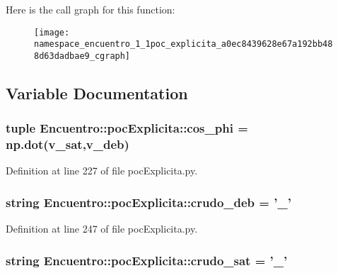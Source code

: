 \-Here is the call graph for this function\-:\nopagebreak
\begin{figure}[H]
\begin{center}
\leavevmode
\texttt{[image: namespace\_encuentro\_1\_1poc\_explicita\_a0ec8439628e67a192bb488d63dadbae9\_cgraph]}
\end{center}
\end{figure}




\subsection{\-Variable \-Documentation}
\subsubsection[{cos\-\_\-phi}]{\setlength{\rightskip}{0pt plus 5cm}tuple {\bf \-Encuentro\-::poc\-Explicita\-::cos\-\_\-phi} = np.\-dot(v\-\_\-sat,v\-\_\-deb)}\label{namespace_encuentro_1_1poc_explicita_a6fbfa27437a7064d705ba018ff939eca}


\-Definition at line 227 of file poc\-Explicita.\-py.

\subsubsection[{crudo\-\_\-deb}]{\setlength{\rightskip}{0pt plus 5cm}string {\bf \-Encuentro\-::poc\-Explicita\-::crudo\-\_\-deb} = '\-\_\-'}\label{namespace_encuentro_1_1poc_explicita_a7487a3ac57d1a4d2f320280a0a19d2da}


\-Definition at line 247 of file poc\-Explicita.\-py.

\subsubsection[{crudo\-\_\-sat}]{\setlength{\rightskip}{0pt plus 5cm}string {\bf \-Encuentro\-::poc\-Explicita\-::crudo\-\_\-sat} = '\-\_\-'}\label{namespace_encuentro_1_1poc_explicita_a1deff3b045a916025d1dfd581c6a8378}


